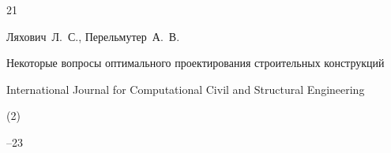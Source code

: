 \begin{thebibliography}{21}




\by Ляхович~Л.~С., Перельмутер~А.~В.

\paper Некоторые вопросы оптимального проектирования строительных конструкций

\jour International Journal for Computational Civil and Structural Engineering


(2)

--23




























\end{thebibliography}
